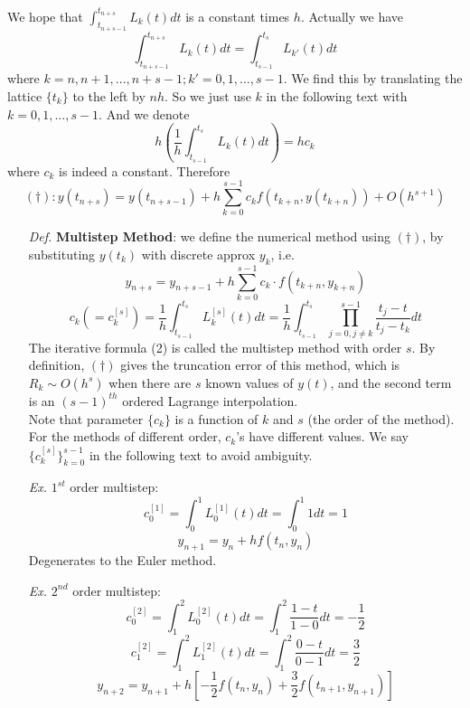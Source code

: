 \documentclass[a4paper, 11pt]{article}
\begin{document}
We hope that $\int_{t_{n+s-1}}^{t_{n+s}} L_k(t)dt$ is a constant times $h$. Actually we have
$$
\int_{t_{n+s-1}}^{t_{n+s}} L_k(t)dt = \int_{t_{s-1}}^{t_{s}} L_{k'}(t)dt
$$
where $k=n,n+1,...,n+s-1; k'=0,1,...,s-1$. We find this by translating the lattice $\{t_{k}\}$ to the left by $nh$. So we just use $k$ in the following text with $k=0,1,...,s-1$.
And we denote
$$
h\left(\frac{1}{h}\int_{t_{s-1}}^{t_{s}} L_{k}(t)dt\right) = hc_k
$$
where $c_k$ is indeed a constant. Therefore
$$
(\dag): y(t_{n+s}) = y(t_{n+s-1}) + h\sum_{k=0}^{s-1} c_kf(t_{k+n}, y(t_{k+n})) + O(h^{s+1})
$$
\begin{itemize}
	\item[\textit{Def.}] \textbf{Multistep Method}: we define the numerical method using $(\dag)$, by substituting $y(t_k)$ with discrete approx $y_k$, i.e.
	\begin{equation}
		y_{n+s} = y_{n+s-1} + h\sum_{k=0}^{s-1} c_k \cdot f(t_{k+n}, y_{k+n})
	\end{equation}
	\begin{equation}
		c_k ( = c_k^{[s]}) = \frac{1}{h} \int_{t_{s-1}}^{t_s} L_k^{[s]}(t)dt = \frac{1}{h} \int_{t_{s-1}}^{t_s} \prod_{j=0,j\ne k}^{s-1}\frac{t_j - t}{t_j - t_k} dt
	\end{equation}
	The iterative formula (2) is called the multistep method with order $s$. By definition, $(\dag)$ gives the truncation error of this method, which is $R_k \sim O(h^s)$ when there are $s$ known values of $y(t)$, and the second term is an $(s-1)^{th}$ ordered Lagrange interpolation. \\
	Note that parameter $\{c_k\}$ is a function of $k$ and $s$ (the order of the method). For the methods of different order, $c_k$'s have different values. We say $\{c_k^{[s]}\}_{k=0}^{s-1}$ in the following text to avoid ambiguity.

	\item[\textit{Ex.}] $1^{st}$ order multistep:
	$$
	c_0^{[1]} = \int_0^1 L_0^{[1]}(t)dt = \int_0^1 1dt = 1
	$$
	$$
	y_{n+1} = y_{n} + h f(t_n, y_n)
	$$
	Degenerates to the Euler method.

	\item[\textit{Ex.}] $2^{nd}$ order multistep:
	$$
	c_0^{[2]} = \int_1^2 L_0^{[2]}(t)dt = \int_1^2 \frac{1-t}{1-0}dt = -\frac{1}{2}
	$$
	$$
	c_1^{[2]} = \int_1^2 L_1^{[2]}(t)dt = \int_1^2 \frac{0-t}{0-1}dt = \frac{3}{2}
	$$
	$$
	y_{n+2} = y_{n+1} + h \left[-\frac{1}{2}f(t_n, y_n)+\frac{3}{2}f(t_{n+1}, y_{n+1})\right]
	$$
	

\end{itemize}
\end{document}
